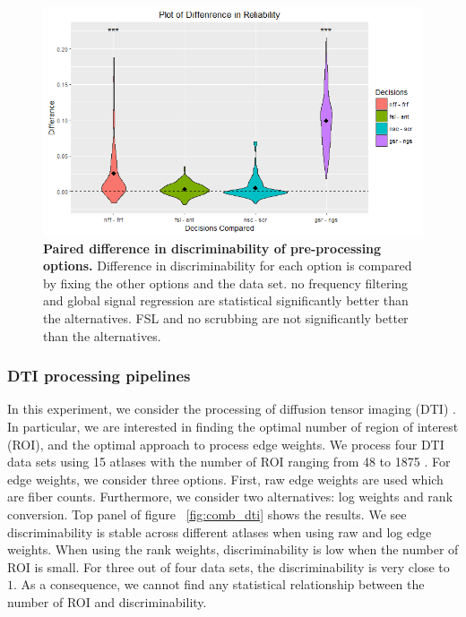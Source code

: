 \documentclass{article}
\begin{document}
\begin{figure}[ht!]
	\includegraphics[width=\linewidth]{../Figs/Differ_violin_mean.png}
	\caption{{ \bf Paired difference in discriminability of pre-processing options.} Difference in discriminability for each option is compared by fixing the other options and the data set. no frequency filtering and global signal regression are statistical significantly better than the alternatives. FSL and no scrubbing are not significantly better than the alternatives.}
	\label{fig:decs}
\end{figure}






\subsubsection{DTI processing pipelines}
In this experiment, we consider the processing of diffusion tensor imaging (DTI) \cite{westin2002processing}. In particular, we are interested in finding the optimal number of region of interest (ROI), and the optimal approach to process edge weights. We process four DTI data sets using 15 atlases with the number of ROI ranging from 48 to 1875 \cite{mori2005mri}. For edge weights, we consider three options. First, raw edge weights are used which are fiber counts. Furthermore, we consider two alternatives: log weights and rank conversion. Top panel of figure ~\ref{fig:comb_dti} shows the results. We see discriminability is stable across different atlases when using raw and log edge weights. When using the rank weights, discriminability is low when the number of ROI is small. For three out of four data sets, the discriminability is very close to $1$. As a consequence, we cannot find any statistical relationship between the number of ROI and discriminability.
\end{document}
